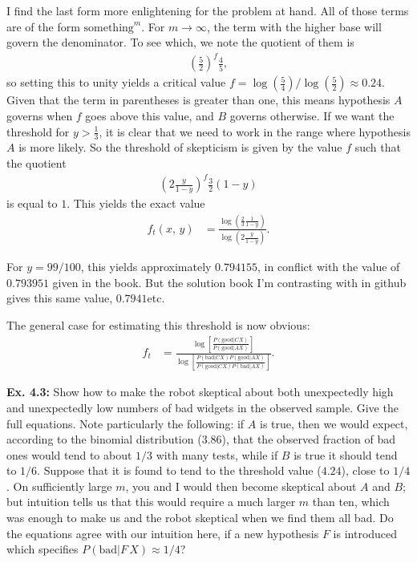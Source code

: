 \documentclass{article}
\begin{document}
I find the last form more enlightening for the problem at hand. All of those terms are of the form $\text{something}^m$. For $m\rightarrow\infty$, the term with the higher base will govern the denominator. To see which, we note the quotient of them is
\begin{align*}
	\left(\frac52\right)^f\frac45,
\end{align*}
so setting this to unity yields a critical value $f=\log\left(\frac54\right)/\log\left(\frac52\right)\approx0.24$. Given that the term in parentheses is greater than one, this means hypothesis $A$ governs when $f$ goes above this value, and $B$ governs otherwise. If we want the threshold for $y>\frac13$, it is clear that we need to work in the range where hypothesis $A$ is more likely. So the threshold of skepticism is given by the value $f$ such that the quotient
\begin{align*}
	\left(2\frac{y}{1-y}\right)^f\frac32(1-y)
\end{align*}
is equal to $1$. This yields the exact value
\begin{align*}
	f_t(x,\,y)&=\frac{\log\left(\frac23\frac1{1-y}\right)}{\log\left(2\frac{y}{1-y}\right)}.
\end{align*}

For $y=99/100$, this yields approximately $0.794155$, in conflict with the value of $0.793951$ given in the book. But the solution book I'm contrasting with in github gives this same value, $0.7941$etc.

The general case for estimating this threshold is now obvious:
\begin{align*}
	f_t&=\frac{\log\left[\frac{P(\text{good}|CX)}{P(\text{good}|AX)}\right]}{\log\left[\frac{P(\text{bad}|CX)P(\text{good}|AX)}{P(\text{good}|CX)P(\text{bad}|AX)}\right]}.
\end{align*}

\textbf{Ex. 4.3: }Show how to make the robot skeptical about both unexpectedly high and unexpectedly low numbers of bad widgets in the observed sample. Give the full equations. Note particularly the following: if $A$ is true, then we would expect, according to the binomial distribution ($3.86$), that the observed fraction of bad ones would tend to about $1/3$ with many tests, while if $B$ is true it should tend to $1/6$. Suppose that it is found to tend to the threshold value ($4.24$), close to $1/4$. On sufficiently large $m$, you and I would then become skeptical about $A$ and $B$; but intuition tells us that this would require a much larger $m$ than ten, which was enough to make us and the robot skeptical when we find them all bad. Do the equations agree with our intuition here, if a new hypothesis $F$ is introduced which specifies $P(\text{bad}|F\,X)\approx1/4$?
\end{document}
